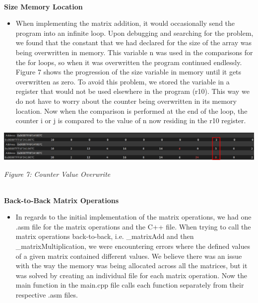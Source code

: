 \documentclass[twoside]{article}
\begin{document}
\noindent \\ \textbf{Size Memory Location}
\begin{itemize}
\item When implementing the matrix addition, it would occasionally send the program into an infinite loop. Upon debugging and searching for the problem, we found that the constant that we had declared for the size of the array was being overwritten in memory. This variable n was used in the comparisons for the for loops, so when it was overwritten the program continued endlessly. Figure 7 shows the progression of the size variable in memory until it gets overwritten as zero. To avoid this problem, we stored the variable in a register that would not be used elsewhere in the program (r10). This way we do not have to worry about the counter being overwritten in its memory location. Now when the comparison is performed at the end of the loop, the counter i or j is compared to the value of n now residing in the r10 register.
\end{itemize}
\centerline{\includegraphics[scale=2]{images/countervalueoverwrite.png}}
\begin{center}\textit{Figure 7: Counter Value Overwrite}\end{center}

\noindent \\ \textbf{Back-to-Back Matrix Operations}
\begin{itemize}
\item In regards to the initial implementation of the matrix operations, we had one .asm file for the matrix operations and the C++ file. When trying to call the matrix operations back-to-back, i.e. \_matrixAdd and then \_matrixMultiplication, we were encountering errors where the defined values of a given matrix contained different values. We believe there was an issue with the way the memory was being allocated across all the matrices, but it was solved by creating an individual file for each matrix operation. Now the main function in the main.cpp file calls each function separately from their respective .asm files.
\end{itemize}
\end{document}
